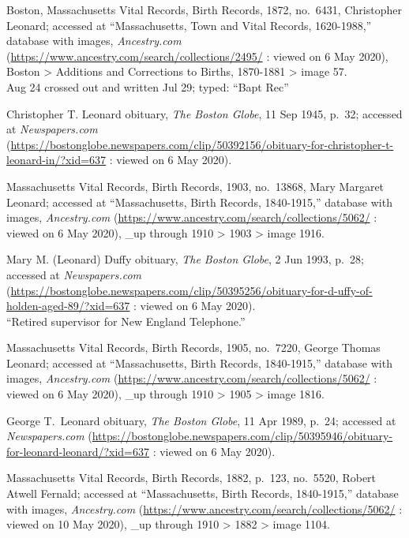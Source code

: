 \begin{thebibliography}{999}
	Boston, Massachusetts Vital Records, Birth Records, 1872, no.\ 6431, Christopher Leonard; accessed at ``Massachusetts, Town and Vital Records, 1620-1988,'' database with images, \textit{Ancestry.com} (\url{https://www.ancestry.com/search/collections/2495/} : viewed on 6 May 2020), Boston > Additions and Corrections to Births, 1870-1881 > image 57.\\
	Aug 24 crossed out and written Jul 29; typed: ``Bapt Rec''
	
	Christopher T. Leonard obituary, \textit{The Boston Globe}, 11 Sep 1945, p.\ 32; accessed at \textit{Newspapers.com} (\url{https://bostonglobe.newspapers.com/clip/50392156/obituary-for-christopher-t-leonard-in/?xid=637} : viewed on 6 May 2020).
	
	Massachusetts Vital Records, Birth Records, 1903, no.\ 13868, Mary Margaret Leonard; accessed at ``Massachusetts, Birth Records, 1840-1915,'' database with images, \textit{Ancestry.com} (\url{https://www.ancestry.com/search/collections/5062/} : viewed on 6 May 2020), \_up through 1910 > 1903 > image 1916.
	
	Mary M. (Leonard) Duffy obituary, \textit{The Boston Globe}, 2 Jun 1993, p.\ 28; accessed at \textit{Newspapers.com} (\url{https://bostonglobe.newspapers.com/clip/50395256/obituary-for-d-uffy-of-holden-aged-89/?xid=637} : viewed on 6 May 2020).\\
	``Retired supervisor for New England Telephone.''
	
	Massachusetts Vital Records, Birth Records, 1905, no.\ 7220, George Thomas Leonard; accessed at ``Massachusetts, Birth Records, 1840-1915,'' database with images, \textit{Ancestry.com} (\url{https://www.ancestry.com/search/collections/5062/} : viewed on 6 May 2020), \_up through 1910 > 1905 > image 1816.
	
	George T.\ Leonard obituary, \textit{The Boston Globe}, 11 Apr 1989, p.\ 24; accessed at \textit{Newspapers.com} (\url{https://bostonglobe.newspapers.com/clip/50395946/obituary-for-leonard-leonard/?xid=637} : viewed on 6 May 2020).
	
	Massachusetts Vital Records, Birth Records, 1882, p.\ 123, no.\ 5520, Robert Atwell Fernald; accessed at ``Massachusetts, Birth Records, 1840-1915,'' database with images, \textit{Ancestry.com} (\url{https://www.ancestry.com/search/collections/5062/} : viewed on 10 May 2020), \_up through 1910 > 1882 > image 1104.
	

\end{thebibliography}
